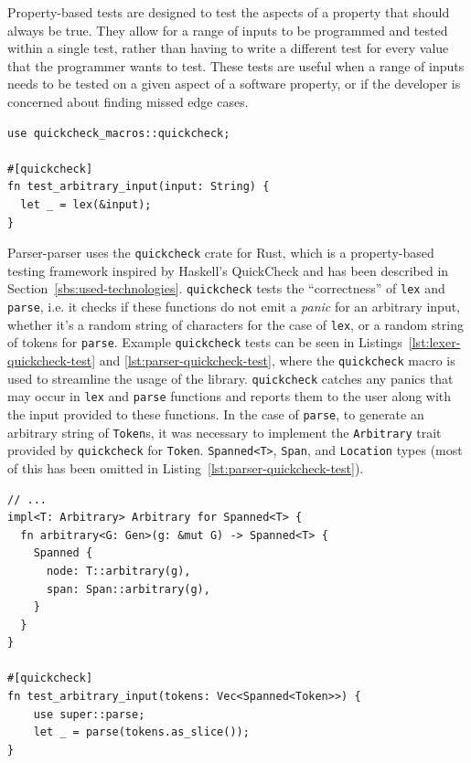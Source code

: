 \documentclass[english,bachelors,forcepolishlogotype]{wizthesis}
\newcommand{\thisproject}{Parser-parser}
\begin{document}
Property-based tests are designed to test the aspects of a property that should
always be true. They allow for a range of inputs to be programmed and tested
within a single test, rather than having to write a different test for every
value that the programmer wants to test. These tests are useful when a range of
inputs needs to be tested on a given aspect of a software property, or if the
developer is concerned about finding missed edge cases.

\begin{listing}[H]
  \begin{verbatim}
use quickcheck_macros::quickcheck;

#[quickcheck]
fn test_arbitrary_input(input: String) {
  let _ = lex(&input);
}
  \end{verbatim}
  \caption{A QuickCheck test testing arbitrary inputs on the lexer.}
  \label{lst:lexer-quickcheck-test}
\end{listing}

\thisproject{} uses the \texttt{quickcheck} crate for Rust, which is a
property-based testing framework inspired by Haskell's QuickCheck and has been
described in Section~\ref{sbs:used-technologies}. \texttt{quickcheck} tests the
``correctness'' of \texttt{lex} and \texttt{parse}, i.e. it checks if these
functions do not emit a \emph{panic} for an arbitrary input, whether it's a
random string of characters for the case of \texttt{lex}, or a random string of
tokens for \texttt{parse}. Example \texttt{quickcheck} tests can be seen in
Listings~\ref{lst:lexer-quickcheck-test} and \ref{lst:parser-quickcheck-test},
where the \texttt{quickcheck} macro is used to streamline the usage of the
library. \texttt{quickcheck} catches any panics that may occur in \texttt{lex}
and \texttt{parse} functions and reports them to the user along with the input
provided to these functions. In the case of \texttt{parse}, to generate an
arbitrary string of \texttt{Token}s, it was necessary to implement the
\texttt{Arbitrary} trait provided by \texttt{quickcheck} for \texttt{Token}.
\texttt{Spanned<T>}, \texttt{Span}, and \texttt{Location} types (most of this
has been omitted in Listing~\ref{lst:parser-quickcheck-test}).

\begin{listing}[H]
  \begin{verbatim}
// ...
impl<T: Arbitrary> Arbitrary for Spanned<T> {
  fn arbitrary<G: Gen>(g: &mut G) -> Spanned<T> {
    Spanned {
      node: T::arbitrary(g),
      span: Span::arbitrary(g),
    }
  }
}

#[quickcheck]
fn test_arbitrary_input(tokens: Vec<Spanned<Token>>) {
    use super::parse;
    let _ = parse(tokens.as_slice());
}
  \end{verbatim}
  \caption{A QuickCheck test related to the parser, testing strings of arbitrary
  tokens.}
  \label{lst:parser-quickcheck-test}
\end{listing}
\end{document}
